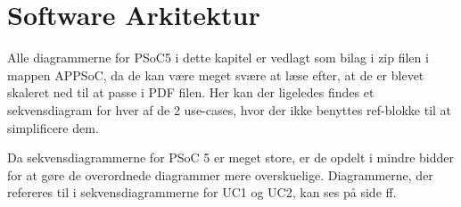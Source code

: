 \chapter{Software Arkitektur}



Alle diagrammerne for PSoC5 i dette kapitel er vedlagt som bilag i zip filen i mappen APPSoC, da de kan være meget svære at læse efter, at de er blevet skaleret ned til at passe i PDF filen. Her kan der ligeledes findes et sekvensdiagram for hver af de 2 use-cases, hvor der ikke benyttes ref-blokke til at simplificere dem.

Da sekvensdiagrammerne for PSoC 5 er meget store, er de opdelt i mindre bidder for at gøre de overordnede diagrammer mere overskuelige. Diagrammerne, der refereres til i sekvensdiagrammerne for UC1 og UC2, kan ses på side \pageref{SD:PSoC:GaaTilPos} ff.








